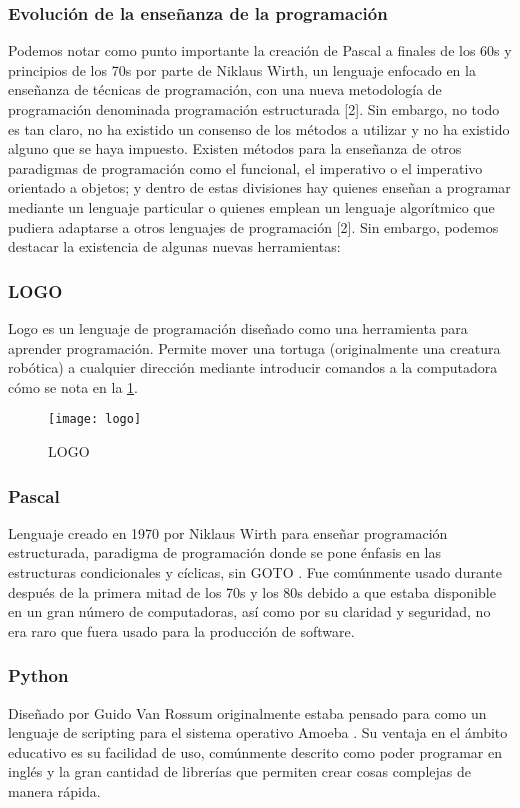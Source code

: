 \subsubsection{Evolución de la enseñanza de la programación}
Podemos notar como punto importante la creación de Pascal a finales de los 60s y principios de los 70s por parte de Niklaus Wirth, un lenguaje enfocado en la enseñanza de técnicas de programación, con una nueva metodología de programación denominada programación estructurada [2]. Sin embargo, no todo es tan claro, no ha existido un consenso de los métodos a utilizar y no ha existido alguno que se haya impuesto. 
Existen métodos para la enseñanza de otros paradigmas de programación como el funcional, el imperativo o el imperativo orientado a objetos; y dentro de estas divisiones hay quienes enseñan a programar mediante un lenguaje particular o quienes emplean un lenguaje algorítmico que pudiera adaptarse a otros lenguajes de programación [2].
Sin embargo, podemos destacar la existencia de algunas nuevas herramientas:

\subsubsection{LOGO}
Logo es un lenguaje de programación diseñado como una herramienta para aprender programación. 
Permite mover una tortuga (originalmente una creatura robótica) a cualquier dirección 
mediante introducir comandos a la computadora \cite{logo_history} cómo se nota en la \ref{fig:logo_scrn}.

\begin{figure}[h]
    \caption{LOGO}
    \centering
    \texttt{[image: logo]}
    \label{fig:logo_scrn}
\end{figure}

\subsubsection{Pascal}
Lenguaje creado en 1970 por Niklaus Wirth para enseñar programación estructurada, 
paradigma de programación donde se pone énfasis en las 
estructuras condicionales y cíclicas, sin GOTO \cite{pascal_history}. 
Fue comúnmente usado durante después de la primera mitad de los 70s y los 80s 
debido a que estaba disponible en un gran número de computadoras, 
así como por su claridad y seguridad, no era raro que fuera usado para la 
producción de software.

\subsubsection{Python}
Diseñado por Guido Van Rossum originalmente estaba pensado 
para como un lenguaje de scripting para el sistema operativo Amoeba \cite{python_history}. 
Su ventaja en el ámbito educativo es su facilidad de uso, comúnmente descrito 
como poder programar en inglés y la gran cantidad de librerías que permiten 
crear cosas complejas de manera rápida.

